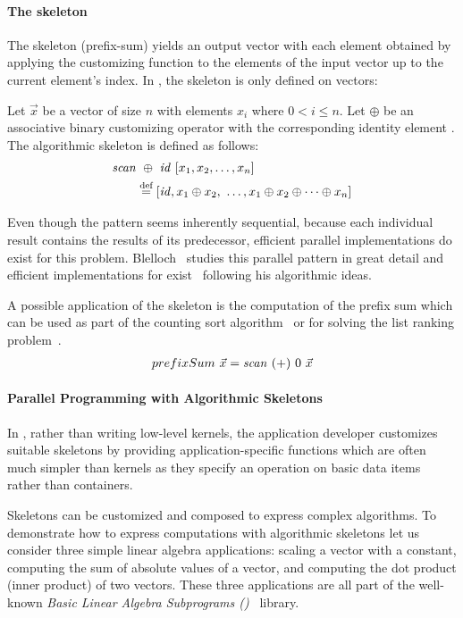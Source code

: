 \paragraph{The \scan skeleton}
The \scan skeleton (\aka prefix-sum) yields an output vector with each element obtained by applying the customizing function to the elements of the input vector up to the current element's index.
In \SkelCL, the \scan skeleton is only defined on vectors:
\begin{definition}
  \label{definition:scan}
  Let $\vec{x}$ be a vector of size $n$ with elements $x_i$ where $0 < i \leq n$.
  Let $\oplus$ be an associative binary customizing operator with the corresponding identity element \id.
  The algorithmic skeleton \scan is defined as follows:
  \begin{equation*}
    \begin{split}
      \text{\textit{scan}}&\ \oplus\ \text{\textit{id}}\ [x_1, x_2, \dots, x_n] \\
      &\stackrel{\textrm{\scriptsize def}}{=} [\text{\textit{id}}, x_1 \oplus x_2,\ \dots,x_1 \oplus x_2 \oplus \cdots \oplus x_n]
    \end{split}
  \end{equation*}
\end{definition}
\noindent
Even though the \scan pattern seems inherently sequential, because each individual result contains the results of its predecessor, efficient parallel implementations do exist for this problem.
Blelloch~\cite{Blelloch1991} studies this parallel pattern in great detail and efficient implementations for \GPUs exist~\cite{HarrisSeOw2007} following his algorithmic ideas.

A possible application of the \scan skeleton is the computation of the prefix sum which can be used as part of the counting sort algorithm~\cite{Knuth1998} or for solving the list ranking problem~\cite{ColeVi1989}.
\begin{align*}
  prefixSum\ \vec{x} = \text{\textit{scan}}\ (+)\ 0\ \vec{x}
\end{align*}

\paragraph{Parallel Programming with Algorithmic Skeletons}
In \SkelCL, rather than writing low-level kernels, the application developer customizes suitable skeletons by providing application-specific functions which are often much simpler than kernels as they specify an operation on basic data items rather than containers.

Skeletons can be customized and composed to express complex algorithms.
To demonstrate how to express computations with algorithmic skeletons let us consider three simple linear algebra applications:
scaling a vector with a constant, computing the sum of absolute values of a vector, and computing the dot product (\aka inner product) of two vectors.
These three applications are all part of the well-known \emph{Basic Linear Algebra Subprograms (\BLAS)}~\cite{Dongarra2002,Dongarra2002a} library.

